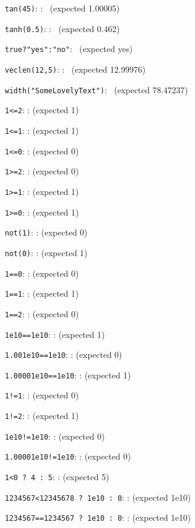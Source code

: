 \documentclass{article}
\begin{document}
\verb|tan(45)|:
    :
   \pgfmathresult\ (expected  1.00005)

\verb|tanh(0.5)|:
    :
   \pgfmathresult\ (expected  0.462)

\verb|true?"yes":"no"|:
   \pgfmathresult\ (expected  yes)

\verb|veclen(12,5)|:
    :
   \pgfmathresult\ (expected  12.99976)

\verb|width("SomeLovelyText")|:
   \pgfmathresult\ (expected  78.47237)

\verb|1<=2|:
	:
	\pgfmathresult (expected 1)

\verb|1<=1|:
	:
	\pgfmathresult (expected 1)

\verb|1<=0|:
	:
	\pgfmathresult (expected 0)

\verb|1>=2|:
	:
	\pgfmathresult (expected 0)

\verb|1>=1|:
	:
	\pgfmathresult (expected 1)

\verb|1>=0|:
	:
	\pgfmathresult (expected 1)

\verb|not(1)|:
	:
	\pgfmathresult (expected 0)

\verb|not(0)|:
	:
	\pgfmathresult (expected 1)

\verb|1==0|:
	:
	\pgfmathresult (expected 0)

\verb|1==1|:
	:
	\pgfmathresult (expected 1)

\verb|1==2|:
	:
	\pgfmathresult (expected 0)

\verb|1e10==1e10|:
	:
	\pgfmathresult (expected 1)

\verb|1.001e10==1e10|:
	:
	\pgfmathresult (expected 0)

\verb|1.00001e10==1e10|:
	:
	\pgfmathresult (expected 1)

\verb|1!=1|:
	:
	\pgfmathresult (expected 0)

\verb|1!=2|:
	:
	\pgfmathresult (expected 1)

\verb|1e10!=1e10|:
	:
	\pgfmathresult (expected 0)

\verb|1.00001e10!=1e10|:
	:
	\pgfmathresult (expected 0)

\verb|1<0 ? 4 : 5|:
	:
	\pgfmathresult (expected 5)

\verb|1234567<12345678 ? 1e10 : 0|:
	:
	\pgfmathresult (expected 1e10)

\verb|1234567==1234567 ? 1e10 : 0|:
	:
	\pgfmathresult (expected 1e10)
\end{document}
